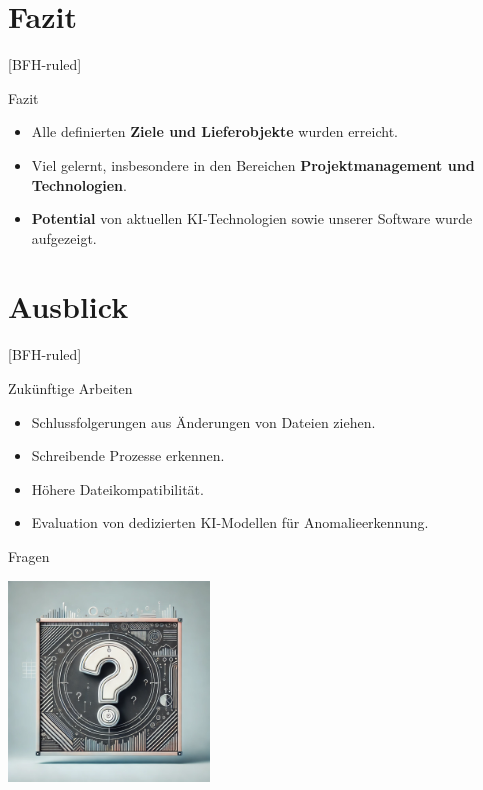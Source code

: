 \documentclass[
    ngerman,%
    authorontitle=true,
]{bfhbeamer}
\begin{document}
    \section{Fazit}\label{sec:fazit}
    [BFH-ruled]
    \frame{\sectionpage}

    \begin{frame}{Fazit}
        \begin{itemize}
            \item Alle definierten \textbf{Ziele und Lieferobjekte} wurden erreicht.
            \item Viel gelernt, insbesondere in den Bereichen \textbf{Projektmanagement und Technologien}.
            \item \textbf{Potential} von aktuellen KI-Technologien sowie unserer Software wurde aufgezeigt.
        \end{itemize}
    \end{frame}

    \section{Ausblick}\label{sec:ausblick}
    [BFH-ruled]
    \frame{\sectionpage}

    \begin{frame}{Zukünftige Arbeiten}
        \begin{itemize}
            \item Schlussfolgerungen aus Änderungen von Dateien ziehen.
            \item Schreibende Prozesse erkennen.
            \item Höhere Dateikompatibilität.
            \item Evaluation von dedizierten KI-Modellen für Anomalieerkennung.
        \end{itemize}
    \end{frame}

    \begin{frame}{Fragen}
        \begin{center}
            \includegraphics[width=0.4\textwidth]{assets/presentation/questions_frame_image}
        \end{center}
    \end{frame}
\end{document}

